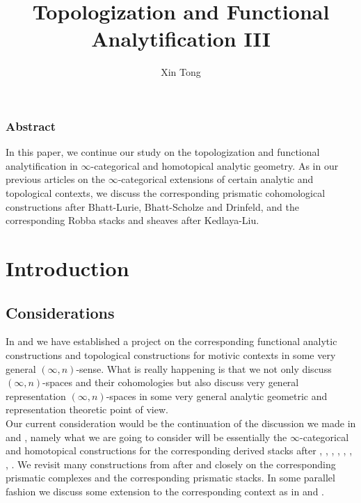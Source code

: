 \documentclass[12pt]{book}
\begin{document}
\normalfont



\title{Topologization and Functional Analytification III}
\author{Xin Tong}
\date{}



\maketitle


\subsection*{Abstract}
\rm In this paper, we continue our study on the topologization and functional analytification in $\infty$-categorical and homotopical analytic geometry. As in our previous articles on the $\infty$-categorical extensions of certain analytic and topological contexts, we discuss the corresponding prismatic cohomological constructions after Bhatt-Lurie, Bhatt-Scholze and Drinfeld, and the corresponding Robba stacks and sheaves after Kedlaya-Liu.




\newpage

\tableofcontents


\newpage



\chapter{Introduction}
\section{Considerations}

\indent In \cite{T1} and \cite{T2} we have established a project on the corresponding functional analytic constructions and topological constructions for motivic contexts in some very general $(\infty,n)$-sense. What is really happening is that we not only discuss $(\infty,n)$-spaces and their cohomologies but also discuss very general representation $(\infty,n)$-spaces in some very general analytic geometric and representation theoretic point of view. \\

\indent Our current consideration would be the continuation of the discussion we made in \cite{T1} and \cite{T2}, namely what we are going to consider will be essentially the $\infty$-categorical and homotopical constructions for the corresponding derived stacks after \cite{BK}, \cite{BBK}, \cite{BBBK}, \cite{BBM}, \cite{KKM}, \cite{CS1}, \cite{CS2}, \cite{CS3}. We revisit many constructions from \cite{T2} after \cite{BS} and \cite{BL} closely on the corresponding prismatic complexes and the corresponding prismatic stacks. In some parallel fashion we discuss some extension to the corresponding context as in \cite{KL1} and \cite{KL2}. \\
\end{document}
